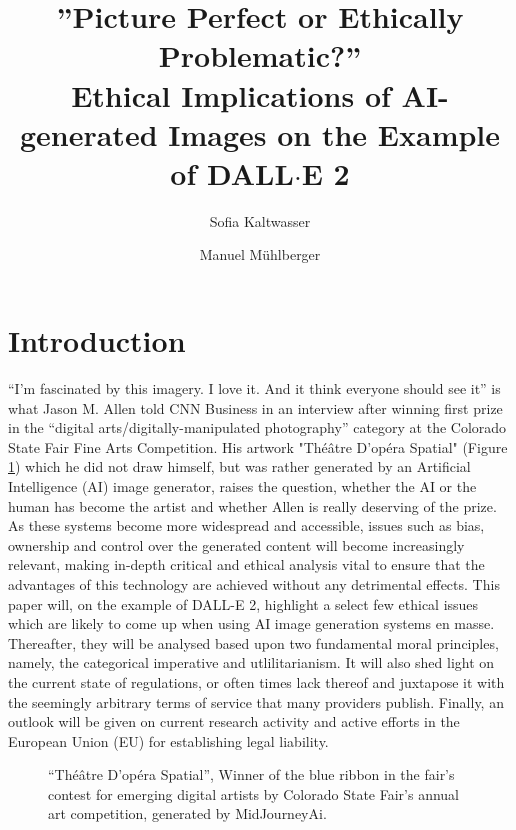 \documentclass[10pt,twocolumn,twoside]{osajnl}
\title{”Picture Perfect or Ethically Problematic?” \\ Ethical Implications of AI-generated Images on the Example of DALL$\cdot$E 2}
\author[1]{Sofia Kaltwasser}
\author[2]{Manuel Mühlberger}
\affil[1]{University of Potsdam}
\affil[2]{School of Computation, Information and Technology, TU Munich}
\begin{document}
\maketitle

\section{Introduction}
“I’m fascinated by this imagery. I love it. And it think everyone should see it” is what Jason M. Allen told CNN Business in an interview after winning first prize in the “digital arts/digitally-manipulated photography” category at the Colorado State Fair Fine Arts Competition\cite{JasonMAllenCNN}.
His artwork "Théâtre D’opéra Spatial" (Figure \ref{Theatre}) which he did not draw himself, but was rather generated by an Artificial Intelligence (AI) image generator, raises the question, whether the AI or the human has become the artist and whether Allen is really deserving of the prize.
As these systems become more widespread and accessible, issues such as bias, ownership and control over the generated content will become increasingly relevant, making in-depth critical and ethical analysis vital to ensure that the advantages of this technology are achieved without any detrimental effects. 
This paper will, on the example of DALL-E 2, highlight a select few ethical issues which are likely to come up when using AI image generation systems en masse. 
Thereafter, they will be analysed based upon two fundamental moral principles, namely, the categorical imperative and utlilitarianism. 
It will also shed light on the current state of regulations, or often times lack thereof and juxtapose it with the seemingly arbitrary terms of service that many providers publish. 
Finally, an outlook will be given on current research activity and active efforts in the European Union (EU) for establishing legal liability. 
\begin{figure}[htbp]
	\centering
	\caption{“Théâtre D’opéra Spatial”, Winner of the blue ribbon in the fair’s contest for emerging digital artists by Colorado State Fair’s annual art competition, generated by MidJourneyAi\cite{OperaSpecial}.}
	\label{Theatre}
\end{figure}
\end{document}
